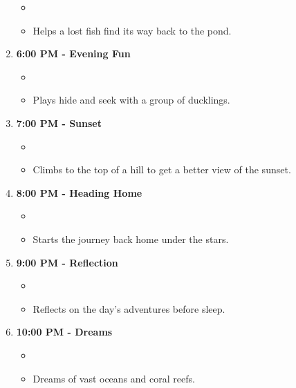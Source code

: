 \documentclass{article}
\begin{document}
\begin{enumerate}
\begin{itemize}
\item %
\item Helps a lost fish find its way back to the pond.
\end{itemize}
\item \textbf{6:00 PM - Evening Fun}
\begin{itemize}
\item %
\item Plays hide and seek with a group of ducklings.
\end{itemize}
\item \textbf{7:00 PM - Sunset}
\begin{itemize}
\item %
\item Climbs to the top of a hill to get a better view of the sunset.
\end{itemize}
\item \textbf{8:00 PM - Heading Home}
\begin{itemize}
\item %
\item Starts the journey back home under the stars.
\end{itemize}
\item \textbf{9:00 PM - Reflection}
\begin{itemize}
\item %
\item Reflects on the day's adventures before sleep.
\end{itemize}
\item \textbf{10:00 PM - Dreams}
\begin{itemize}
\item %

\item Dreams of vast oceans and coral reefs.
\end{itemize}

\end{enumerate}
\end{document}
